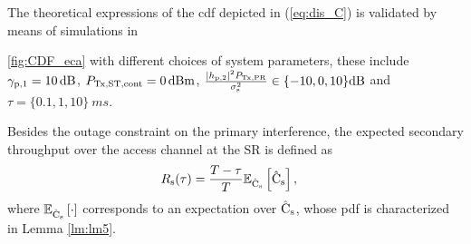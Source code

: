 The theoretical expressions of the cdf depicted in (\ref{eq:dis_C}) is validated by means of simulations in \figurename~{\ref{fig:CDF_eca} with different choices of system parameters, these include ${\gamma}_{\text{p,1}} = \SI{10}{dB}$, $P_{\text{Tx,ST,cont}} = \SI{0}{dBm}$, $\frac{|h_{\text{p,2}}|^2 P_{\text{Tx,PR}}}{\sigma^2_{\text{s}}} \in \{-10, 0, 10\} \SI{}{dB}$ and $\tau = \{0.1, 1, 10\} \SI{}{ms}$. 

Besides the outage constraint on the primary interference, the expected secondary throughput over the access channel at the SR is defined as
\begin{align}
\rs(\tau) %
          &= \frac{T - \tau}{T} \e{\eca} {\eca}, \label{eq:rs}
\end{align} 
where ${\mathbb E}_{\hat{\text{{C}}}_{\text{s}}}\left[ \cdot \right]$ corresponds to an expectation over $\hat{\text{{C}}}_{\text{s}}$, whose pdf is characterized in Lemma \ref{lm:lm5}. 

}
